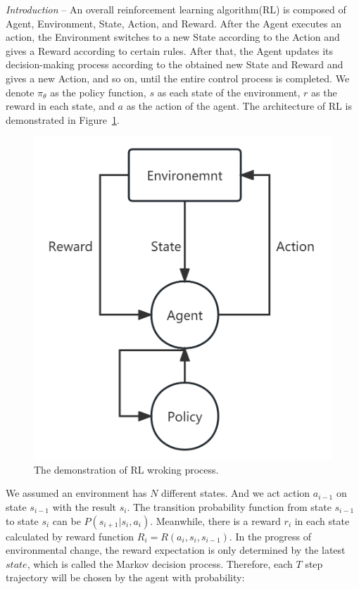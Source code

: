 \textit{Introduction} -- An overall reinforcement learning algorithm(RL) is composed of Agent, Environment, State, Action, and Reward. After the Agent executes an action, the Environment switches to a new State according to the Action and gives a Reward according to certain rules. After that, the Agent updates its decision-making process according to the obtained new State and Reward and gives a new Action, and so on, until the entire control process is completed. We denote $\pi_{\theta}$ as the policy function, $s$ as each state of the environment, $r$ as the reward in each state, and $a$ as the action of the agent. The architecture of RL is demonstrated in Figure~\ref{RL_frame}.
\begin{figure}[ht]
  \centering
  \includegraphics[scale=0.4]{tex/5.4.5_RL/RL.png}
  \caption{\label{RL_frame} The demonstration of RL wroking process.}
\end{figure} 

We assumed an environment has $N$ different states. And we act action $a_{i-1}$ on state $s_{i-1}$ with the result $s_{i}$. The transition probability function from state $s_{i-1}$ to state $s_{i}$ can be $P(s_{i+1}|s_{i},a_{i})$. Meanwhile, there is a reward $r_i$ in each state calculated by reward function $R_i=R(a_i,s_i,s_{i-1})$. In the progress of environmental change, the reward expectation is only determined by the latest $state$, which is called the Markov decision process. Therefore, each $T$ step trajectory will be chosen by the agent with probability:

